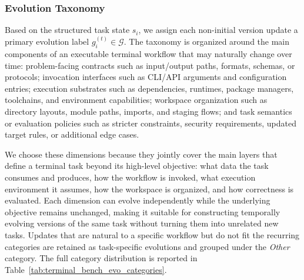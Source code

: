 \documentclass{article}
\begin{document}
\subsubsection{Evolution Taxonomy}
\label{app:terminal_taxonomy}
Based on the structured task state $s_i$, we assign each non-initial version update a primary evolution label $g_i^{(t)} \in \mathcal{G}$. The taxonomy is organized around the main components of an executable terminal workflow that may naturally change over time: problem-facing contracts such as input/output paths, formats, schemas, or protocols; invocation interfaces such as CLI/API arguments and configuration entries; execution substrates such as dependencies, runtimes, package managers, toolchains, and environment capabilities; workspace organization such as directory layouts, module paths, imports, and staging flows; and task semantics or evaluation policies such as stricter constraints, security requirements, updated target rules, or additional edge cases.

We choose these dimensions because they jointly cover the main layers that define a terminal task beyond its high-level objective: what data the task consumes and produces, how the workflow is invoked, what execution environment it assumes, how the workspace is organized, and how correctness is evaluated. Each dimension can evolve independently while the underlying objective remains unchanged, making it suitable for constructing temporally evolving versions of the same task without turning them into unrelated new tasks. Updates that are natural to a specific workflow but do not fit the recurring categories are retained as task-specific evolutions and grouped under the \emph{Other} category. The full category distribution is reported in Table~\ref{tab:terminal_bench_evo_categories}.
\end{document}
